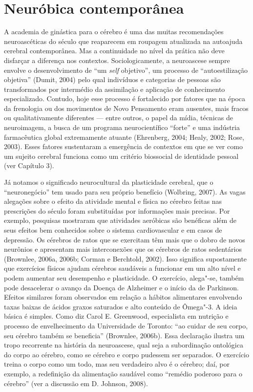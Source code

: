 \section*{Neuróbica contemporânea}

A academia de ginástica para o cérebro é uma das muitas recomendações
neuroascéticas do século  que reaparecem em roupagem atualizada na
autoajuda cerebral contemporânea. Mas a continuidade no nível da prática
não deve disfarçar a diferença nos contextos. Sociologicamente, a
neuroascese sempre envolve o desenvolvimento de ``um \emph{self} objetivo'', um
processo de ``autoestilização objetiva'' (Dumit, 2004) pelo qual
indivíduos e categorias de pessoas são transformados por intermédio da
assimilação e aplicação de conhecimento especializado. Contudo, hoje
esse processo é fortalecido por fatores que na época da frenologia ou
dos movimentos de Novo Pensamento eram ausentes, mais fracos ou
qualitativamente diferentes --- entre outros, o papel da mídia, técnicas
de neuroimagem, a busca de um programa neurocientífico ``forte'' e uma
indústria farmacêutica global extremamente atuante (Ehrenberg, 2004;
Healy, 2002; Rose, 2003). Esses fatores sustentaram a emergência de
contextos em que se ver como um sujeito cerebral funciona como um
critério biossocial de identidade pessoal (ver Capítulo 3).

Já notamos o significado neurocultural da plasticidade cerebral, que
o ``neuronegócio'' tem usado para seu próprio benefício (Wolbring,
2007). As vagas alegações sobre o efeito da atividade mental e física no
cérebro feitas nas prescrições do século  foram substituídas por
informações mais precisas. Por exemplo, pesquisas mostraram que
atividades aeróbicas são benéficas além de seus efeitos bem conhecidos
sobre o sistema cardiovascular e em casos de depressão. Os cérebros de
ratos que se exercitam têm mais que o dobro de novos neurônios e
apresentam mais interconexões que os cérebros de ratos sedentários
(Brownlee, 2006a, 2006b; Corman e Berchtold, 2002). Isso
significa supostamente que exercícios físicos ajudam cérebros saudáveis a funcionar
em um alto nível e podem aumentar seu desempenho e plasticidade. O
exercício, alega"-se, também pode desacelerar o avanço da Doença de
Alzheimer e o início da de Parkinson. Efeitos similares foram observados
em relação a hábitos alimentares envolvendo taxas baixas de ácidos
graxos saturados e alto conteúdo de Ômega"-3. A ideia básica é simples.
Como diz Carol E. Greenwood, especialista em nutrição e processo de
envelhecimento da Universidade de Toronto: ``ao cuidar de seu corpo, seu
cérebro também se beneficia'' (Brownlee, 2006b). Essa declaração ilustra
um tropo recorrente na história da neuroascese, qual seja a subordinação
ontológica do corpo ao cérebro, como se cérebro e corpo pudessem ser
separados. O exercício treina o corpo como um todo, mas seu verdadeiro
alvo é o cérebro; daí, por exemplo, a redefinição da alimentação
saudável como ``remédio poderoso para o cérebro'' (ver a discussão em D.
Johnson, 2008).

